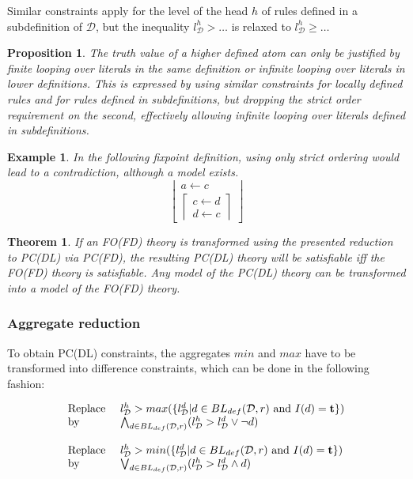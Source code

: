 \documentclass{tlp}
\newcommand{\Tr}{\mbox{\bf t}}
\newcommand{\rul}{\leftarrow}
\newcommand{\lev}[2]{\ensuremath{l_{#1}^{#2}}}
\newcommand{\defset}[2]{BL_{def}(#1, #2)}
\newcommand{\lfd}[1]{\ensuremath{\left \lfloor \begin{array}{l}#1\end{array} \right \rfloor }}
\newcommand{\gfd}[1]{\ensuremath{\left \lceil \begin{array}{l}#1\end{array} \right \rceil}}
\newcommand{\FD}{\ensuremath{\mathcal{D}}\xspace}
\newtheorem{theorem}[lemma]{Theorem}
\newtheorem{proposition}[lemma]{Proposition}
\newtheorem{example}[lemma]{Example}
\begin{document}
Similar constraints apply for the level of the head $h$ of rules defined in a subdefinition of $\FD$, but the inequality $\lev{\FD}{h} > \ldots$ is relaxed to $\lev{\FD}{h} \geq \ldots$

\begin{proposition}
The truth value of a higher defined atom can only be justified by finite looping over literals in the same definition or infinite looping over literals in lower definitions. This is expressed by using similar constraints for locally defined rules and for rules defined in subdefinitions, but dropping the strict order requirement on the second, effectively allowing infinite looping over literals defined in subdefinitions.
\end{proposition}

\begin{example}
In the following fixpoint definition, using only strict ordering would lead to a contradiction, although a model exists.
\[\lfd{
	a \rul c \\
	\gfd{
		c \rul d \\
		d \rul c
	}
}\]
\end{example}

\begin{theorem}
If an FO(FD) theory is transformed using the presented reduction to PC(DL) via PC(FD), the resulting PC(DL) theory will be satisfiable iff the FO(FD) theory is satisfiable. Any model of the PC(DL) theory can be transformed into a model of the FO(FD) theory. \end{theorem}

\subsubsection{Aggregate reduction}
To obtain PC(DL) constraints, the aggregates $min$ and $max$ have to be transformed into difference constraints, which can be done in the following fashion:

\[
\begin{array}{ll}
\text{Replace }&\lev{\FD}{h}>max(\{\lev{\FD}{d}|d \in \defset{\FD}{r} \ \text{and} \ I(d) =\Tr\}) \\
\text{by }& \bigwedge_{d \in \defset{\FD}{r}} (\lev{\FD}{h}>\lev{\FD}{d} \lor \lnot d) \\
& \\
\text{Replace }&\lev{\FD}{h}>min(\{\lev{\FD}{d}|d \in \defset{\FD}{r} \ \text{and} \ I(d)=\Tr\}) \\
\text{by }& \bigvee_{d \in \defset{\FD}{r}} (\lev{\FD}{h}>\lev{\FD}{d} \land d)
\end{array}
\]
\end{document}
